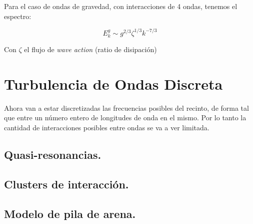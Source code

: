 Para el caso de ondas de gravedad, con interacciones de 4 ondas, tenemos el espectro:

\begin{equation}
	E^g_k \sim g^{2/3} \zeta^{1/3} k^{-7/3}
\end{equation}

Con $\zeta$ el flujo de \textit{wave action} (ratio de disipación)



\section{Turbulencia de Ondas Discreta}
Ahora van a estar discretizadas las frecuencias posibles del recinto, de forma tal que entre un número entero de longitudes de onda en el mismo. Por lo tanto la cantidad de interacciones posibles entre ondas se va a ver limitada. 

\subsection*{Quasi-resonancias.}

\subsection*{Clusters de interacción.}

\subsection*{Modelo de pila de arena.}














%
%
%
%


